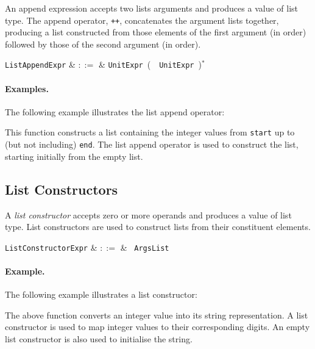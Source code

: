 An append expression accepts two lists arguments and produces a value of list type.  The append operator, \lstinline{++}, concatenates the argument lists together, producing a list constructed from those elements of the first argument (in order) followed by those of the second argument (in order).

\begin{syntax}
  \verb+ListAppendExpr+ & $::=$ & \verb+UnitExpr+\ \big(\ \token{++}\
  \verb+UnitExpr+\ \big)$^*$\\
\end{syntax}

\paragraph{Examples.} The following example illustrates the list append operator:



This function constructs a list containing the integer values from \lstinline{start} up to (but not including) \lstinline{end}.  The list append operator is used to construct the list, starting initially from the empty list.


\subsection{List Constructors}
\label{c_expr_list_constructor}
A {\em list constructor} accepts zero or more operands and produces a value of list type.  List constructors are used to construct lists from their constituent elements.  

\begin{syntax}
  \verb+ListConstructorExpr+ & $::=$ & \token{[}\ \verb+ArgsList+ \token{]}\\
\end{syntax}

\paragraph{Example.}  The following example illustrates a list constructor:



The above function converts an integer value into its string representation.  A list constructor is used to map integer values to their corresponding digits.  An empty list constructor is also used to initialise the string.

